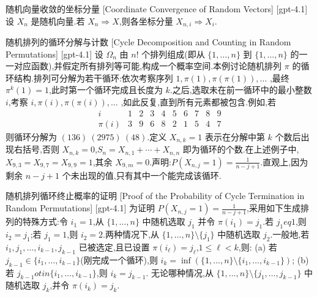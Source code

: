 \documentclass[UTF8]{ctexart}
\begin{document}
    
    
    \begin{thm}
        {随机向量收敛的坐标分量}
        [Coordinate Convergence of Random Vectors]
        [gpt-4.1]
        设 $X_n$ 是随机向量.若 $X_n \Rightarrow X$,则各坐标分量 $X_{n,i} \Rightarrow X_i$.
    \end{thm}
    
    
    
    \begin{xmp}
        {随机排列的循环分解与计数}
        [Cycle Decomposition and Counting in Random Permutations]
        [gpt-4.1]
        设 $\Omega_n$ 由 $n!$ 个排列组成(即从 $\{ 1, \ldots, n \}$ 到 $\{ 1, \ldots, n \}$ 的一一对应函数),并假定所有排列等可能,构成一个概率空间.本例讨论随机排列 $\pi$ 的循环结构.排列可分解为若干循环:依次考察序列 $1, \pi(1), \pi(\pi(1)), \ldots$ ,最终 $\pi^k(1) = 1$,此时第一个循环完成且长度为 $k$.之后,选取未在前一循环中的最小整数 $i$,考察 $i, \pi(i), \pi(\pi(i)), \ldots$ ,如此反复,直到所有元素都被包含.例如,若
\[
\begin{array}{cccccccccc}
i & 1 & 2 & 3 & 4 & 5 & 6 & 7 & 8 & 9 \\
\pi(i) & 3 & 9 & 6 & 8 & 2 & 1 & 5 & 4 & 7
\end{array}
\]
则循环分解为 $(136)\ (2975)\ (48)$.定义 $X_{n,k} = 1$ 表示在分解中第 $k$ 个数后出现右括号,否则 $X_{n,k} = 0$,$S_n = X_{n,1} + \cdots + X_{n,n}$ 即为循环的个数.在上述例子中,$X_{9,3} = X_{9,7} = X_{9,9} = 1$,其余 $X_{9,m} = 0$.声明:$P(X_{n,j} = 1) = \frac{1}{n-j+1}$.直观上,因为剩余 $n-j+1$ 个未出现的值,只有其中一个能完成该循环.

    \end{xmp}
    
    
    
    \begin{prf}
        {随机排列循环终止概率的证明}
        [Proof of the Probability of Cycle Termination in Random Permutations]
        [gpt-4.1]
        为证明 $P(X_{n,j} = 1) = \frac{1}{n-j+1}$,采用如下生成排列的特殊方式:令 $i_1 = 1$,从 $\{ 1, \ldots, n \}$ 中随机选取 $j_1$ 并令 $\pi(i_1) = j_1$.若 $j_1 
eq 1$,则 $i_2 = j_1$;若 $j_1 = 1$,则 $i_2 = 2$.两种情况下,从 $\{ 1, \ldots, n \} \setminus \{ j_1 \}$ 中随机选取 $j_2$.一般地,若 $i_1, j_1, \ldots, i_{k-1}, j_{k-1}$ 已被选定,且已设置 $\pi(i_\ell) = j_\ell$,$1 \leq \ell < k$,则:
(a) 若 $j_{k-1} \in \{ i_1, \ldots, i_{k-1} \}$(刚完成一个循环),则 $i_k = \inf ( \{ 1, \ldots, n \} \setminus \{ i_1, \ldots, i_{k-1} \} )$;
(b) 若 $j_{k-1} 
otin \{ i_1, \ldots, i_{k-1} \}$,则 $i_k = j_{k-1}$.
无论哪种情况,从 $\{ 1, \ldots, n \} \setminus \{ j_1, \ldots, j_{k-1} \}$ 中随机选取 $j_k$,并令 $\pi(i_k) = j_k$.

    \end{prf}
    
\end{document}
